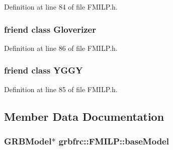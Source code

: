 Definition at line 84 of file F\+M\+I\+L\+P.\+h.

\subsubsection[{\texorpdfstring{Gloverizer}{Gloverizer}}]{\setlength{\rightskip}{0pt plus 5cm}friend class {\bf Gloverizer}\hspace{0.3cm}{\ttfamily [friend]}}\hypertarget{classgrbfrc_1_1FMILP_ae46934249303b16d5e90251e221b363e}{}\label{classgrbfrc_1_1FMILP_ae46934249303b16d5e90251e221b363e}


Definition at line 86 of file F\+M\+I\+L\+P.\+h.

\subsubsection[{\texorpdfstring{Y\+G\+GY}{YGGY}}]{\setlength{\rightskip}{0pt plus 5cm}friend class {\bf Y\+G\+GY}\hspace{0.3cm}{\ttfamily [friend]}}\hypertarget{classgrbfrc_1_1FMILP_ab4df4b3fe13c29ab1a27a64a8da3f093}{}\label{classgrbfrc_1_1FMILP_ab4df4b3fe13c29ab1a27a64a8da3f093}


Definition at line 85 of file F\+M\+I\+L\+P.\+h.



\subsection{Member Data Documentation}
\subsubsection[{\texorpdfstring{base\+Model}{baseModel}}]{\setlength{\rightskip}{0pt plus 5cm}G\+R\+B\+Model$\ast$ grbfrc\+::\+F\+M\+I\+L\+P\+::base\+Model\hspace{0.3cm}{\ttfamily [private]}}\hypertarget{classgrbfrc_1_1FMILP_a587e886dcaa1ece325a7f283100182a8}{}\label{classgrbfrc_1_1FMILP_a587e886dcaa1ece325a7f283100182a8}


